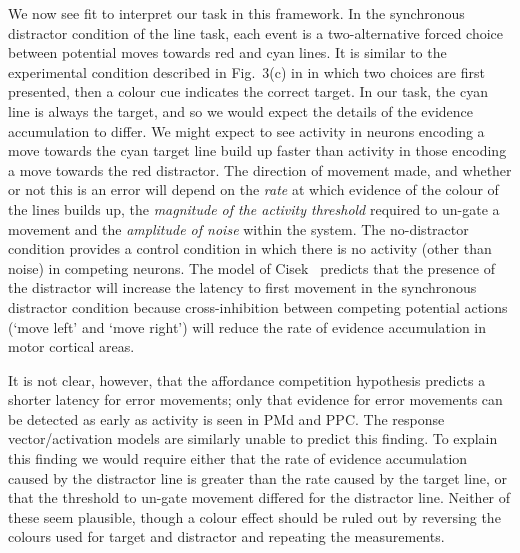 \documentclass[10pt,letterpaper]{article}
\begin{document}
We now see fit to interpret our task in this framework. In the
synchronous distractor condition of the line task, each event is a
two-alternative forced choice between potential moves towards red and
cyan lines. It is similar to the experimental condition described in
Fig.~3(c) in \cite{cisek_cortical_2007} in which two choices are first
presented, then a colour cue indicates the correct target. In our
task, the cyan line is always the target, and so we would expect the
details of the evidence accumulation to differ.  We might expect to
see activity in neurons encoding a move towards the cyan target line
build up faster than activity in those encoding a move towards the red
distractor. The direction of movement made, and whether or not this is
an error will depend on the \emph{rate} at which evidence of the
colour of the lines builds up, the \emph{magnitude of the activity
  threshold} required to un-gate a movement and the \emph{amplitude of
  noise} within the system. The no-distractor condition provides a
control condition in which there is no activity (other than noise) in
competing neurons. The model of Cisek~\cite{cisek_cortical_2007}
predicts that the presence of the distractor will increase the latency
to first movement in the synchronous distractor condition because
cross-inhibition between competing potential actions (`move left' and
`move right') will reduce the rate of evidence accumulation in motor
cortical areas.

It is not clear, however, that the affordance competition hypothesis
predicts a shorter latency for error movements; only that evidence for
error movements can be detected as early as activity is seen in PMd
and PPC. The response vector/activation models are similarly unable to
predict this finding. To explain this finding we would require either
that the rate of evidence accumulation caused by the distractor line
is greater than the rate caused by the target line, or that the
threshold to un-gate movement differed for the distractor
line. Neither of these seem plausible, though a colour effect should
be ruled out by reversing the colours used for target and distractor
and repeating the measurements.
\end{document}

